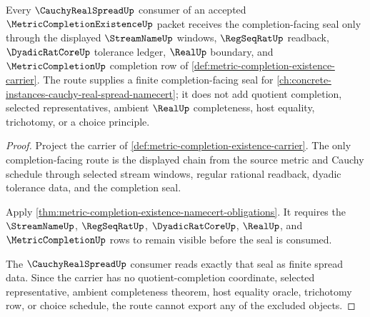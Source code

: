 \begin{theorem}
\label{thm:metric-completion-existence-cauchy-real-spread-route}
Every $\CauchyRealSpreadUp$ consumer of an accepted $\MetricCompletionExistenceUp$ packet receives the completion-facing seal only through the displayed $\StreamNameUp$ windows, $\RegSeqRatUp$ readback, $\DyadicRatCoreUp$ tolerance ledger, $\RealUp$ boundary, and $\MetricCompletionUp$ completion row of \autoref{def:metric-completion-existence-carrier}. The route supplies a finite completion-facing seal for \autoref{ch:concrete-instances-cauchy-real-spread-namecert}; it does not add quotient completion, selected representatives, ambient $\RealUp$ completeness, host equality, trichotomy, or a choice principle.
\end{theorem}
\begin{proof}
Project the carrier of \autoref{def:metric-completion-existence-carrier}. The only completion-facing route is the displayed chain from the source metric and Cauchy schedule through selected stream windows, regular rational readback, dyadic tolerance data, and the completion seal.

Apply \autoref{thm:metric-completion-existence-namecert-obligations}. It requires the $\StreamNameUp$, $\RegSeqRatUp$, $\DyadicRatCoreUp$, $\RealUp$, and $\MetricCompletionUp$ rows to remain visible before the seal is consumed.

The $\CauchyRealSpreadUp$ consumer reads exactly that seal as finite spread data. Since the carrier has no quotient-completion coordinate, selected representative, ambient completeness theorem, host equality oracle, trichotomy row, or choice schedule, the route cannot export any of the excluded objects.
\end{proof}
